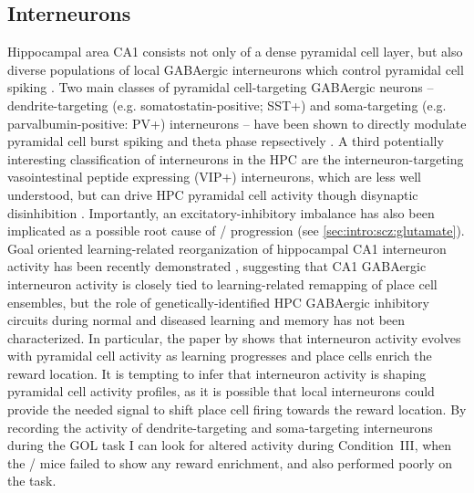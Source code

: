 \subsection{Interneurons}
Hippocampal area CA1 consists not only of a dense pyramidal cell layer, but also diverse populations of local GABAergic interneurons which control pyramidal cell spiking \citep{Freund1996}.
Two main classes of pyramidal cell-targeting GABAergic neurons -- dendrite-targeting (e.g. somatostatin-positive; SST+) and soma-targeting (e.g. parvalbumin-positive: PV+) interneurons -- have been shown to directly modulate pyramidal cell burst spiking and theta phase repsectively \citep{Royer2012, Lovett-Barron2012}.
A third potentially interesting classification of interneurons in the \ac{HPC} are the interneuron-targeting vasointestinal peptide expressing (VIP+) interneurons, which are less well understood, but can drive \ac{HPC} pyramidal cell activity though disynaptic disinhibition \citep{Chamberland2012}.
Importantly, an excitatory-inhibitory imbalance has also been implicated as a possible root cause of \scz/ progression (see \autoref{sec:intro:scz:glutamate}).
Goal oriented learning-related reorganization of hippocampal CA1 interneuron activity has been recently demonstrated \citep{Dupret2013}, suggesting that CA1 GABAergic interneuron activity is closely tied to learning-related remapping of place cell ensembles, but the role of genetically-identified \ac{HPC} GABAergic inhibitory circuits during normal and diseased learning and memory has not been characterized.
In particular, the paper by \citeauthor{Dupret2013} shows that interneuron activity evolves with pyramidal cell activity as learning progresses and place cells enrich the reward location.
It is tempting to infer that interneuron activity is shaping pyramidal cell activity profiles, as it is possible that local interneurons could provide the needed signal to shift place cell firing towards the reward location.
By recording the activity of dendrite-targeting and soma-targeting interneurons during the \ac{GOL} task I can look for altered activity during Condition~III, when the \df/ mice failed to show any reward enrichment, and also performed poorly on the task.

